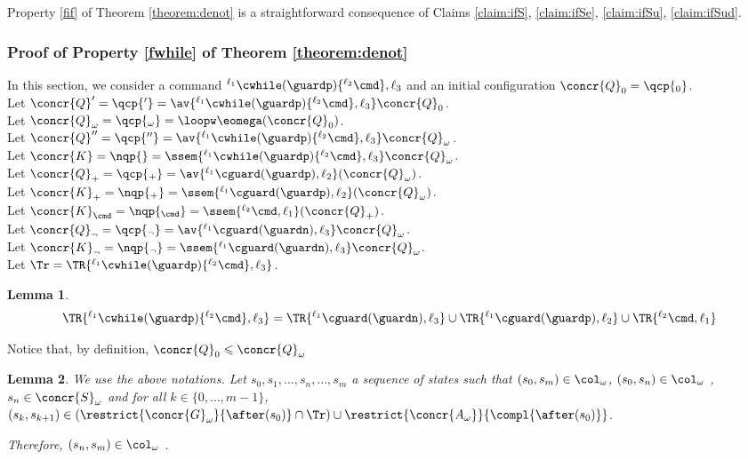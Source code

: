\documentclass[12pt]{article}
\let\firstunion\cup
\let\firstinter\cap
\let\cup\firstunion
\let\cap\firstinter
\newcommand{\li}[1]{ {}^{\ell_{#1}}  }
\newtheorem{lemma}{Lemma}
\begin{document}
 Property \ref{fif} of Theorem \ref{theorem:denot} is a straightforward consequence of Claims \ref{claim:ifS}, \ref{claim:ifSe},  \ref{claim:ifSu}, \ref{claim:ifSud}.

\subsubsection{Proof of Property \ref{fwhile} of Theorem \ref{theorem:denot}} 


In this section, we consider a command \(\li1 \cwhile(\guardp)\{\li2\cmd\},\ell_3\) and an initial configuration \(\concr{Q}_0=\qcp{_0}\).\\
Let \(\concr{Q}'=\qcp{'}=\av{\li1 \cwhile(\guardp)\{\li2\cmd\},\ell_3 }\concr{Q}_0\).\\
Let \(\concr{Q}_{\omega}=\qcp{_{\omega}}=\loopw\eomega(\concr{Q}_0)\).\\
Let \(\concr{Q}''=\qcp{''}=\av{\li1 \cwhile(\guardp)\{\li2\cmd\},\ell_3 }\concr{Q}_{\omega}\).\\
Let \(\concr{K}=\nqp{}=\ssem{\li1 \cwhile(\guardp)\{\li2\cmd\},\ell_3 }\concr{Q}_{\omega}\).\\
Let \(\concr{Q}_{+}=\qcp{_{+}}=\av{\li1\cguard(\guardp),\ell_2}(\concr{Q}_{\omega})\).\\
Let \(\concr{K}_{+}=\nqp{_{+}}=\ssem{\li1\cguard(\guardp),\ell_2}(\concr{Q}_{\omega})\).\\
Let \(\concr{K}_{\cmd}=\nqp{_{\cmd}}=\ssem{  \li2\cmd,\ell_1}(\concr{Q}_{+})\).\\
Let \(\concr{Q}_{\neg}=\qcp{_{\neg}}= \av{\li1 \cguard(\guardn),\ell_3}\concr{Q}_{\omega}\).\\
Let \(\concr{K}_{\neg}=\nqp{_{\neg}}= \ssem{\li1 \cguard(\guardn),\ell_3}\concr{Q}_{\omega}\).\\
Let \(\Tr = \TR{\li1 \cwhile(\guardp)\{\li2\cmd\},\ell_3}\).

\begin{lemma}\label{lemma:Gw}
 \[\TR{\li1 \cwhile(\guardp)\{\li2\cmd\},\ell_3}=\TR{\li1 \cguard(\guardn),\ell_3}\cup\TR{\li1\cguard(\guardp),\ell_2}\cup\TR{\li2\cmd,\ell_1}\]
\end{lemma}

Notice that, by definition, \(\concr{Q}_0\leqslant \concr{Q}_{\omega}\)

\begin{lemma}\label{lemma:apresw} We use the above notations.
 Let \(s_0,s_1,\ldots,s_n,\ldots,s_m\) a sequence of states such that \((s_0,s_m)\in\col_{\omega}\), \((s_0,s_n)\in\col_{\omega}\) , \(s_n\in\concr{S}_{\omega} \) and for all \(k\in\{0,\ldots,m-1\}\), \((s_k,s_{k+1})\in (\restrict{{\concr{G}_{\omega}}}{\after(s_0)}\cap\Tr)\cup\restrict{\concr{A_{\omega}}}{\compl{\after(s_0)}}\).
 
 Therefore, \((s_n,s_{m})\in\col_{\omega}\) .
\end{lemma}
\end{document}
